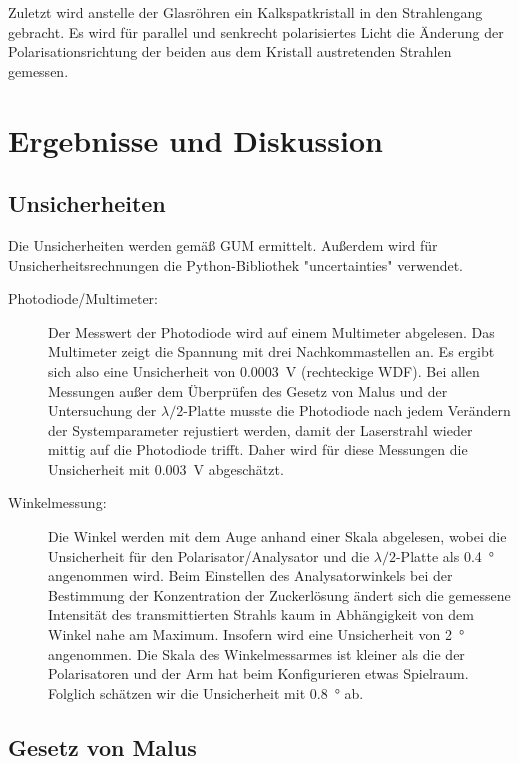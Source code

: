 \documentclass[
	a4paper,
	12pt,
	pagesize,
	ngerman
]{scrartcl}
\begin{document}
	Zuletzt wird anstelle der Glasröhren ein Kalkspatkristall in den Strahlengang gebracht.
	Es wird für parallel und senkrecht polarisiertes Licht die Änderung der Polarisationsrichtung der beiden aus dem Kristall austretenden Strahlen gemessen.
	
	\section{Ergebnisse und Diskussion}
	
	\subsection{Unsicherheiten} %
	Die Unsicherheiten werden gemäß GUM ermittelt. 
	Außerdem wird für Unsicherheitsrechnungen die Python-Bibliothek "uncertainties" verwendet.
	\begin{description}
		\item[Photodiode/Multimeter:] Der Messwert der Photodiode wird auf einem Multimeter abgelesen. 
			Das Multimeter zeigt die Spannung mit drei Nachkommastellen an. 
			Es ergibt sich also eine Unsicherheit von \SI{0,0003}{V} (rechteckige WDF).
			Bei allen Messungen außer dem Überprüfen des Gesetz von Malus und der Untersuchung der $\lambda/2$-Platte musste die Photodiode nach jedem Verändern der Systemparameter rejustiert werden, damit der Laserstrahl wieder mittig auf die Photodiode trifft. 
			Daher wird für diese Messungen die Unsicherheit mit \SI{0,003}{V} abgeschätzt. 
		\item[Winkelmessung:]  Die Winkel werden mit dem Auge anhand einer Skala abgelesen, wobei die Unsicherheit für den Polarisator/Analysator und die $\lambda/2$-Platte als \SI{0,4}{\degree} angenommen wird. 
			Beim Einstellen des Analysatorwinkels bei der Bestimmung der Konzentration der Zuckerlösung ändert sich die gemessene Intensität des transmittierten Strahls kaum in Abhängigkeit von dem Winkel nahe am Maximum. 
			Insofern wird eine Unsicherheit von \SI{2}{\degree} angenommen.
			Die Skala des Winkelmessarmes ist kleiner als die der Polarisatoren und der Arm hat beim Konfigurieren etwas Spielraum. 
			Folglich schätzen wir die Unsicherheit mit \SI{0,8}{\degree} ab.
	\end{description} 

	\subsection{Gesetz von Malus}
\end{document}
